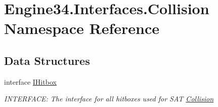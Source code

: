 \hypertarget{a00256}{}\section{Engine34.\+Interfaces.\+Collision Namespace Reference}
\label{a00256}
\subsection*{Data Structures}
\begin{DoxyCompactItemize}
\item 
interface \hyperlink{a00434}{I\+Hitbox}
\begin{DoxyCompactList}\small\item\em I\+N\+T\+E\+R\+F\+A\+CE\+: The interface for all hitboxes used for S\+AT \hyperlink{a00256}{Collision} \end{DoxyCompactList}\end{DoxyCompactItemize}
